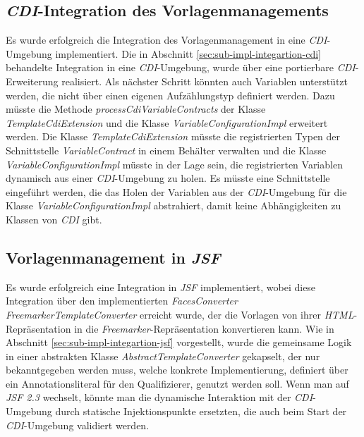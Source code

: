 \subsection{\emph{CDI}-Integration des Vorlagenmanagements}
Es wurde erfolgreich die Integration des Vorlagenmanagement in eine \emph{CDI}-Umgebung implementiert. Die in Abschnitt \ref{sec:sub-impl-integartion-cdi} behandelte Integration in eine \emph{CDI}-Umgebung, wurde über eine portierbare \emph{CDI}-Erweiterung realisiert. Als nächster Schritt könnten auch Variablen unterstützt werden, die nicht über einen eigenen Aufzählungstyp definiert werden. Dazu müsste die Methode \emph{processCdiVariableContracts} der Klasse \emph{TemplateCdiExtension} und die Klasse \emph{VariableConfigurationImpl} erweitert werden. Die Klasse \emph{TemplateCdiExtension} müsste die registrierten Typen der Schnittstelle \emph{VariableContract} in einem Behälter verwalten und die Klasse \emph{VariableConfigurationImpl} müsste in der Lage sein, die registrierten Variablen dynamisch aus einer \emph{CDI}-Umgebung zu holen. Es müsste eine Schnittstelle eingeführt werden, die das Holen der Variablen aus der \emph{CDI}-Umgebung für die Klasse \emph{VariableConfigurationImpl} abstrahiert, damit keine Abhängigkeiten zu Klassen von \emph{CDI} gibt.

\subsection{Vorlagenmanagement in \emph{JSF}}
Es wurde erfolgreich eine Integration in \emph{JSF} implementiert, wobei diese Integration über den implementierten \emph{FacesConverter} \emph{FreemarkerTemplateConverter} erreicht wurde, der die Vorlagen von ihrer \emph{HTML}-Repräsentation in die \emph{Freemarker}-Repräsentation konvertieren kann. Wie in Abschnitt \ref{sec:sub-impl-integartion-jsf} vorgestellt, wurde die gemeinsame Logik in einer abstrakten Klasse \emph{AbstractTemplateConverter} gekapselt, der nur bekanntgegeben werden muss, welche konkrete Implementierung, definiert über ein Annotationsliteral für den Qualifizierer, genutzt werden soll. Wenn man auf \emph{JSF 2.3} wechselt, könnte man die dynamische Interaktion mit der \emph{CDI}-Umgebung durch statische Injektionspunkte ersetzten, die auch beim Start der \emph{CDI}-Umgebung validiert werden. 

